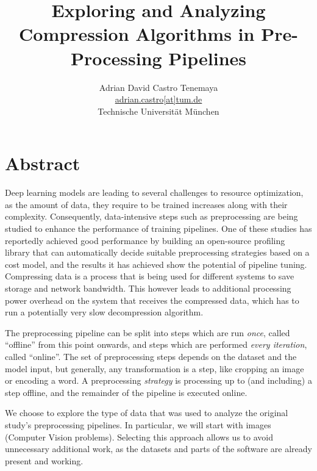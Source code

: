 \documentclass{article}
\begin{document}
\title{Exploring and Analyzing Compression Algorithms in Pre-Processing Pipelines}

\author{Adrian David Castro Tenemaya
    \\ \href{mailto:adrian.castro@tum.de}{adrian.castro[at]tum.de}
    \\ Technische Universit{\"a}t M{\"u}nchen}


\maketitle

\thispagestyle{empty}

\section*{Abstract}

Deep learning models are leading to several challenges to resource optimization, as the amount of data, they require to be trained increases along with their complexity. Consequently, data-intensive steps such as preprocessing are being studied to enhance the performance of training pipelines. One of these studies \cite{isenko2021} has reportedly achieved good performance by building an open-source profiling library that can automatically decide suitable preprocessing strategies based on a cost model, and the results it has achieved show the potential of pipeline tuning. Compressing data is a process that is being used for different systems to save storage and network bandwidth. This however leads to additional processing power overhead on the system that receives the compressed data, which has to run a potentially very slow decompression algorithm.

The preprocessing pipeline can be split into steps which are run \textit{once}, called ``offline'' from this point onwards, and steps which are performed \textit{every iteration}, called ``online''. The set of preprocessing steps depends on the dataset and the model input, but generally, any transformation is a step, like cropping an image or encoding a word. A preprocessing \textit{strategy} is processing up to (and including) a step offline, and the remainder of the pipeline is executed online.

We choose to explore the type of data that was used to analyze the original study's preprocessing pipelines. In particular, we will start with images (Computer Vision problems). Selecting this approach allows us to avoid unnecessary additional work, as the datasets and parts of the software are already present and working.
\end{document}
